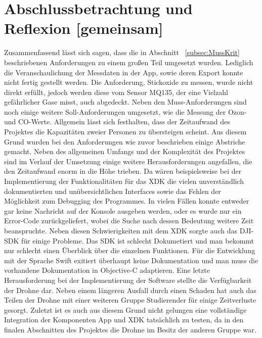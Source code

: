 
\chapter{Abschlussbetrachtung und Reflexion [gemeinsam]}\label{cha:Fazit}
Zusammenfassend lässt sich sagen, dass die in Abschnitt ~\ref{subsec:MussKrit} beschriebenen Anforderungen zu einem großen Teil umgesetzt wurden.\newline
Lediglich die Veranschaulichung der Messdaten in der App, sowie deren Export konnte nicht fertig gestellt werden. Die Anforderung, Stickoxide zu messen, wurde nicht direkt erfüllt, jedoch werden diese vom Sensor MQ135, der eine Vielzahl gefährlicher Gase misst, auch abgedeckt. Neben den Muss-Anforderungen sind noch einige weitere Soll-Anforderungen umgesetzt, wie die Messung der Ozon- und \acl{CO}-Werte.\newline
\newline
Allgemein lässt sich festhalten, dass der Zeitaufwand des Projektes die Kapazitäten zweier Personen zu übersteigen scheint. Aus diesem Grund wurden bei den Anforderungen wie zuvor beschrieben einige Abstriche gemacht. Neben des allgemeinen Umfangs und der Komplexität des Projektes sind im Verlauf der Umsetzung einige weitere Herausforderungen angefallen, die den Zeitaufwand enorm in die Höhe trieben. \newline
\newline
Da wären beispielsweise bei der Implementierung der Funktionalitäten für das \acs{XDK} die vielen unverständlich dokumentierten und unübersichtlichen Interfaces sowie das Fehlen der Möglichkeit zum Debugging des Programmes. In vielen Fällen konnte entweder gar keine Nachricht auf der Konsole ausgeben werden, oder es wurde nur ein Error-Code zurückgeliefert, wobei die Suche nach dessen Bedeutung weitere Zeit beanspruchte.\newline
Neben diesen Schwierigkeiten mit dem \acs{XDK} sorgte auch das \acs{DJI}-\acs{SDK} für einige Probleme. \newline
Das \acs{SDK} ist schlecht Dokumetiert und man bekommt nur schlecht einen Überblick über die einzelnen Funktionen. Für die Entwicklung mit der Sprache Swift exitiert überhaupt keine Dokumentation und man muss die vorhandene Dokumentation in Objective-C adaptieren. \newline
\newline 
Eine letzte Herausforderung bei der Implementierung der Software stellte die Verfügbarkeit der Drohne dar. Neben einem längeren Ausfall durch einen Schaden hat auch das Teilen der Drohne mit einer weiteren Gruppe Studierender für einige Zeitverluste gesorgt. Zuletzt ist es auch aus diesem Grund nicht gelungen eine vollständige Integration der Komponenten App und \acs{XDK} tatsächlich zu testen, da in den finalen Abschnitten des Projektes die Drohne im Besitz der anderen Gruppe war.
